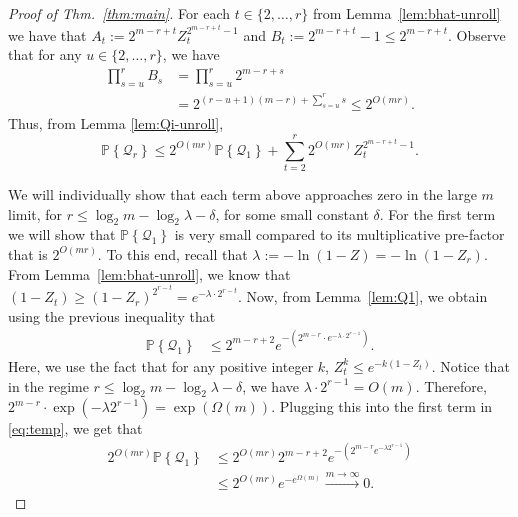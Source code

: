 \documentclass[10pt,a4paper]{amsart}
\newcommand{\PR}[1]{{\mathbb{P}}\left\{ #1\right\}}
\newcommand{\cQ}{\ensuremath{\mathcal{Q}}}
\begin{document}
\begin{proof}[Proof of Thm.~\ref{thm:main}]
    For each $ t \in  \{ 2 , \ldots, r \}$ from Lemma~\ref{lem:bhat-unroll} we have that $A_t := 2^{m-r+t}  Z_t^{2^{m-r+t}-1}$ and $B_t := 2^{m-r+t}-1 \leq 2^{m-r+t}.$
    Observe that for any $u\in \{2,\ldots,r\}$, we have
    \begin{align*}
       \prod_{s=u}^r B_s &=  \prod_{s=u}^r 2^{m-r+s} \\&=2^{(r-u+1)(m-r)+\sum_{s=u}^r s}
\leq 2^{O(mr)}.
    \end{align*}
Thus, from Lemma \ref{lem:Qi-unroll},
\begin{equation}
\label{eq:temp}
    \PR{\cQ_r}
\leq 2^{O(mr)} \PR{ \cQ_1} + \sum_{t=2 }^r 2^{ O(mr)} Z_t^{2^{m-r+t}-1}.
\end{equation}

We will individually show that each term above approaches zero in the large $m$ limit, for $r \le \log_2 m -\log_2 \lambda-\delta$, for some small constant $\delta$. For the first term we will show that $\PR{\cQ_1}$ is very small compared to its multiplicative pre-factor that is $2^{ O(mr)}$. To this end, recall that $ \lambda := -\ln( 1- Z) = -\ln( 1- Z_r)$. From Lemma~\ref{lem:bhat-unroll}, we know that
$
    ( 1 - Z_t ) \geq ( 1 - Z_r)^{2^{r-t}} = e^{-\lambda \cdot 2^{r-t}}.
$
Now, from Lemma~\ref{lem:Q1}, we obtain using the previous inequality that
\begin{equation*}\label{eq:asym-Q1}
\begin{aligned}
        \PR{ \cQ_1} %
       & \leq  2^{m-r+2} e^{-(2^{m-r}\cdot  e^{  -\lambda\cdot 2^{r-1}})}.
       \end{aligned}
\end{equation*} 
Here, we use the fact that for any positive integer $k$, $ Z_t^{k} \leq e^{ -k ( 1- Z_t)  } $. Notice that in the regime $r \le \log_2 m -\log_2 \lambda -\delta$, we have $ \lambda\cdot 2^{r-1} = O(m)$. Therefore,
$
      2^{m-r}\cdot\exp(-\lambda 2^{r-1})=\exp(\Omega(m)).
$
Plugging this into the first term in \eqref{eq:temp}, we get that
\begin{equation*}
    \begin{aligned}
        2^{O(mr)} \PR{ \cQ_1}  &\leq 2^{O(mr)}  2^{m-r+2} e^{-(2^{m-r}  e^{  -\lambda 2^{r-1}})}\\
        & \leq 2^{O(mr)} e^{-e^{\Omega (m) }}\xrightarrow{m\to \infty} 0.
    \end{aligned}
\end{equation*}


\end{proof}
\end{document}
